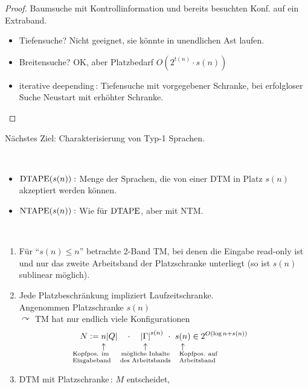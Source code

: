 {\begin{proof}
	Baumsuche mit Kontrollinformation und bereits besuchten Konf. auf ein Extraband.
	\begin{itemize}
	\item Tiefensuche? Nicht geeignet, sie könnte in unendlichen Ast laufen.
	\item Breitensuche? OK, aber Platzbedarf $O(2^{t(n)}\cdot s(n))$
	\item iterative deepending\,: Tiefensuche mit vorgegebener Schranke, bei erfolgloser Suche Neustart mit erhöhter Schranke. \qedhere
	\end{itemize}
\end{proof}
Nächstes Ziel: Charakterisierung von Typ-1 Sprachen.
\begin{Def}[name={[$\DTAPE$ und $\NTAPE$]}]\
\begin{itemize}
\item $\operatorname{DTAPE}(s(n)):$ Menge der Sprachen, die von einer \ac{DTM} in Platz $s(n)$ akzeptiert werden können.
\item $\operatorname{NTAPE}(s(n)):$ Wie für $\DTAPE$, aber mit \ac{NTM}. \qedhere
\end{itemize}
\end{Def}
\begin{Bemerkung}\
	\newcommand{\underarrowset}[2]{%
		\underset{%
			\mathclap{%
				\overset{\displaystyle\uparrow}{\mathclap{#1}}%
			}%
		}{#2}%
	}
	\begin{enumerate}
	\item Für "`$s(n)\leq n$"' betrachte 2-Band \ac{TM}, bei denen die Eingabe read-only ist und nur das zweite Arbeitsband der Platzschranke unterliegt (so ist $s(n)$ sublinear möglich).
	\item Jede Platzbeschränkung impliziert Laufzeitschranke.\\
	Angenommen Platzschranke $s(n)$\\
	$\curvearrowright$ \ac{TM} hat nur endlich viele Konfigurationen
	\[ N := \underarrowset{%
			\parbox{\widthof{\scriptsize Eingabeband}}{\raggedright\scriptsize Kopfpos. im Eingabeband}\hspace{1cm}
		}{n\vphantom{|}}
		|Q| \quad\cdot\quad
		\underarrowset{\parbox{2.2cm}{\scriptsize\centering mögliche Inhalte des Arbeitsbands}}{|\Gamma|}^{s(n)}
		\ \cdot\
		\underarrowset{\hspace{1.7cm}\parbox{2cm}{\scriptsize Kopfpos. auf\\ Arbeitsband}}{s(n)}
		\in 2^{O(\log n + s(n))}
	\]
	\item \ac{DTM} mit Platzschranke\,: $M$ entscheidet,\\

\end{enumerate}
\end{Bemerkung}}

